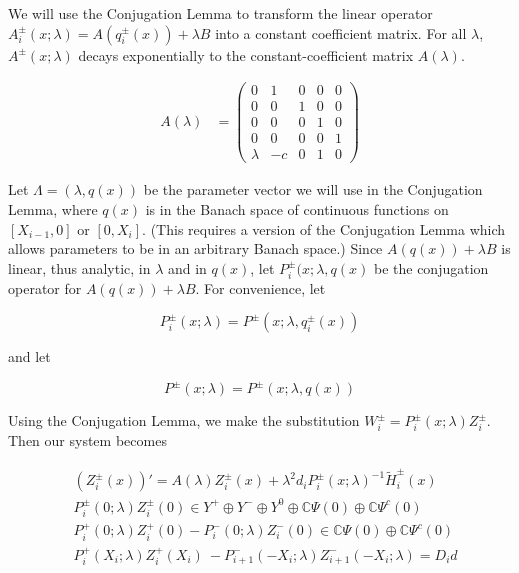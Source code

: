 \documentclass[12pt]{article}
\def\C{{\mathbb C}}
\begin{document}
We will use the Conjugation Lemma to transform the linear operator $A_i^\pm(x; \lambda) = A( q_i^\pm(x) ) + \lambda B$ into a constant coefficient matrix. For all $\lambda$, $A^\pm(x; \lambda)$ decays exponentially to the constant-coefficient matrix $A(\lambda)$. 

\begin{align}\label{Alambda}
A(\lambda) &= \begin{pmatrix}0 & 1 & 0 & 0 & 0 \\0 & 0 & 1 & 0 & 0 \\0 & 0 & 0 & 1 & 0 \\0 & 0 & 0 & 0 & 1 \\
\lambda & -c & 0 & 1 & 0 \end{pmatrix}
\end{align}

Let $\Lambda = (\lambda, q(x))$ be the parameter vector we will use in the Conjugation Lemma, where $q(x)$ is in the Banach space of continuous functions on $[X_{i-1}, 0]$ or $[0, X_i]$. (This requires a version of the Conjugation Lemma which allows parameters to be in an arbitrary Banach space.) Since $A( q(x) ) + \lambda B$ is linear, thus analytic, in $\lambda$ and in $q(x)$, let $P_i^\pm(x; \lambda, q(x)$ be the conjugation operator for $A( q(x) ) + \lambda B$. For convenience, let  

\begin{equation}
P_i^\pm(x; \lambda) = P^\pm(x; \lambda, q_i^\pm(x) )
\end{equation}

and let

\begin{equation}
P^\pm(x; \lambda) = P^\pm(x; \lambda, q(x) )
\end{equation}

Using the Conjugation Lemma, we make the substitution $W_i^\pm = P_i^\pm(x; \lambda) Z_i^\pm$. Then our system becomes

\begin{subequations}
\begin{align}
&(Z_i^\pm(x))' = A(\lambda) Z_i^\pm(x) + \lambda^2 d_i P_i^\pm(x; \lambda)^{-1} \tilde{H}_i^\pm(x) \label{systemZ} \\
&P_i^\pm(0; \lambda) Z_i^\pm(0) \in Y^+ \oplus Y^- \oplus Y^0 \oplus \C \Psi(0) \oplus \C \Psi^c(0) \label{systemcenter1} \\
&P_i^+(0; \lambda) Z_i^+(0) - P_i^-(0; \lambda) Z_i^-(0) \in \C \Psi(0) \oplus \C \Psi^c(0) \label{systemcenter2} \\
&P_i^+(X_i; \lambda) Z_i^+(X_i)\ - P_{i+1}^-(-X_i; \lambda) Z_{i+1}^-(-X_i; \lambda) = D_i d \label{systemmiddle}
\end{align}
\end{subequations}
\end{document}
